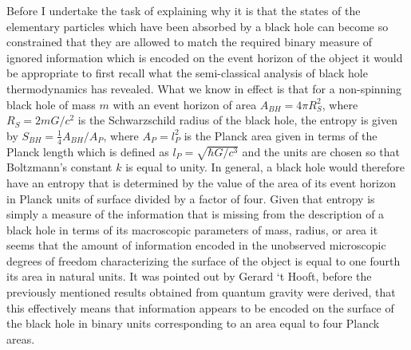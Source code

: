 \documentclass[notitlepage,12pt]{report}
\begin{document}
\noindent Before I undertake the task of explaining why it is that the states of the elementary particles which have been absorbed by a black hole can become so constrained that they are allowed to match the required binary measure of ignored information which is encoded on the event horizon of the object it would be appropriate to first recall what the semi-classical analysis of black hole thermodynamics has revealed. What we know in effect is that for a non-spinning black hole of mass $m$ with an event horizon of area $A_{BH}=4\pi R_S^2$, where $R_S=2 mG/c^2$ is the Schwarzschild radius of the black hole, the entropy is given by $S_{BH}=\frac{1}{4} A_{BH}/A_P$, where $A_P=l_P^2$ is the Planck area given in terms of the Planck length which is defined as $l_P=\sqrt{\hbar G/c^3}$ and the units are chosen so that Boltzmann's constant $k$ is equal to unity. In general, a black hole would therefore have an entropy that is determined by the value of the area of its event horizon in Planck units of surface divided by a factor of four. Given that entropy is simply a measure of the information that is missing from the description of a black hole in terms of its macroscopic parameters of mass, radius, or area it seems that the amount of information encoded in the unobserved microscopic degrees of freedom characterizing the surface of the object is equal to one fourth its area in natural units. It was pointed out by Gerard `t Hooft, before the previously mentioned results obtained from quantum gravity were derived, that this effectively means that information appears to be encoded on the surface of the black hole in binary units corresponding to an area equal to four Planck areas.
\end{document}
